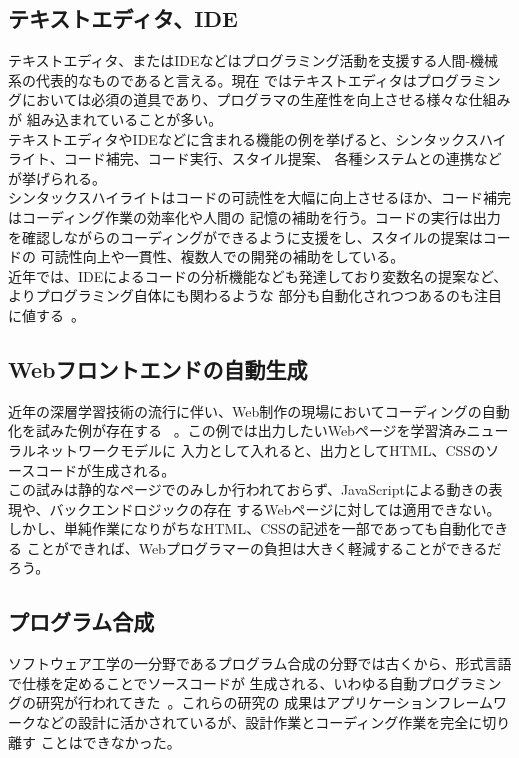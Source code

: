 \documentclass[10pt,a4paper]{ltjsarticle}       %
\begin{document}
\subsection{テキストエディタ、IDE}
テキストエディタ、またはIDEなどはプログラミング活動を支援する人間-機械系の代表的なものであると言える。現在
ではテキストエディタはプログラミングにおいては必須の道具であり、プログラマの生産性を向上させる様々な仕組みが
組み込まれていることが多い。\\

テキストエディタやIDEなどに含まれる機能の例を挙げると、シンタックスハイライト、コード補完、コード実行、スタイル提案、
各種システムとの連携などが挙げられる。\\
シンタックスハイライトはコードの可読性を大幅に向上させるほか、コード補完はコーディング作業の効率化や人間の
記憶の補助を行う。コードの実行は出力を確認しながらのコーディングができるように支援をし、スタイルの提案はコードの
可読性向上や一貫性、複数人での開発の補助をしている。\\

近年では、IDEによるコードの分析機能なども発達しており変数名の提案など、よりプログラミング自体にも関わるような
部分も自動化されつつあるのも注目に値する~\cite{codeanalysis}。
\subsection{Webフロントエンドの自動生成}
近年の深層学習技術の流行に伴い、Web制作の現場においてコーディングの自動化を試みた例が存在する~
\cite{autowebprogramming}。この例では出力したいWebページを学習済みニューラルネットワークモデルに
入力として入れると、出力としてHTML、CSSのソースコードが生成される。\\

この試みは静的なページでのみしか行われておらず、JavaScriptによる動きの表現や、バックエンドロジックの存在
するWebページに対しては適用できない。しかし、単純作業になりがちなHTML、CSSの記述を一部であっても自動化できる
ことができれば、Webプログラマーの負担は大きく軽減することができるだろう。
\subsection{プログラム合成}
ソフトウェア工学の一分野であるプログラム合成の分野では古くから、形式言語で仕様を定めることでソースコードが
生成される、いわゆる自動プログラミングの研究が行われてきた~\cite{softwareassembly}。これらの研究の
成果はアプリケーションフレームワークなどの設計に活かされているが、設計作業とコーディング作業を完全に切り離す
ことはできなかった。\\
\end{document}
